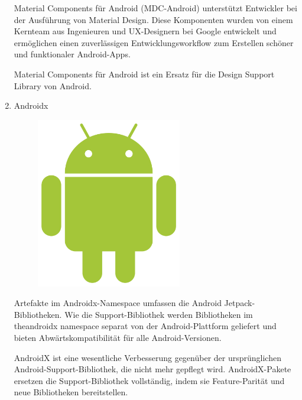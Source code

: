 \documentclass[10pt]{scrartcl}
\begin{document}
\begin{enumerate}

Material Components für Android (MDC-Android) unterstützt Entwickler bei der Ausführung von Material Design. Diese Komponenten wurden von einem Kernteam aus Ingenieuren und UX-Designern bei Google entwickelt und ermöglichen einen zuverlässigen Entwicklungsworkflow zum Erstellen schöner und funktionaler Android-Apps.

Material Components für Android ist ein Ersatz für die Design Support Library von Android.

	\item
	Androidx

\begin{figure}[H]
	\centering
	\includegraphics[width=0.6\textwidth]{Bilder/BibliothekenLogos/AndroidLogo.png}
\end{figure}
	

Artefakte im Androidx-Namespace umfassen die Android Jetpack-Bibliotheken. Wie die Support-Bibliothek werden Bibliotheken im theandroidx namespace separat von der Android-Plattform geliefert und bieten Abwärtskompatibilität für alle Android-Versionen.

AndroidX ist eine wesentliche Verbesserung gegenüber der ursprünglichen Android-Support-Bibliothek, die nicht mehr gepflegt wird. AndroidX-Pakete ersetzen die Support-Bibliothek vollständig, indem sie Feature-Parität und neue Bibliotheken bereitstellen.

\end{enumerate}
\end{document}
